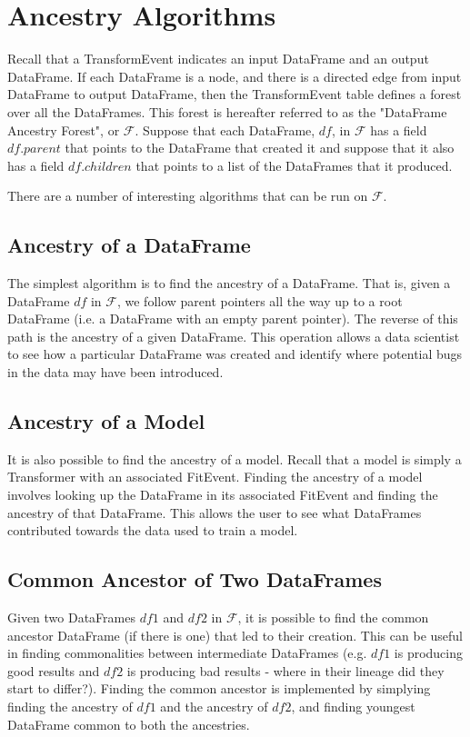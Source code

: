 \section{Ancestry Algorithms}
Recall that a TransformEvent indicates an input DataFrame and an output DataFrame. If each DataFrame is a node,
and there is a directed edge from input DataFrame to output DataFrame, then the TransformEvent table defines
a forest over all the DataFrames. This forest is hereafter referred to as the "DataFrame Ancestry Forest", or $\mathcal{F}$.
Suppose that each DataFrame, $df$, in $\mathcal{F}$ has a field $df.parent$ that points to the DataFrame that created it
and suppose that it also has a field $df.children$ that points to a list of the DataFrames that it produced.

There are a number of interesting algorithms that can be run on $\mathcal{F}$.

\subsection{Ancestry of a DataFrame}
The simplest algorithm is to find the ancestry of a DataFrame. That is, given a DataFrame $df$ in $\mathcal{F}$, we
follow parent pointers all the way up to a root DataFrame (i.e. a DataFrame with an empty parent pointer). The reverse
of this path is the ancestry of a given DataFrame. This operation allows a data scientist to see how a particular DataFrame
was created and identify where potential bugs in the data may have been introduced.

\subsection{Ancestry of a Model}
It is also possible to find the ancestry of a model. Recall that a model is simply a Transformer with an associated
FitEvent. Finding the ancestry of a model involves looking up the DataFrame in its associated FitEvent and finding the
ancestry of that DataFrame. This allows the user to see what DataFrames contributed towards the data used to train a model.

\subsection{Common Ancestor of Two DataFrames}
Given two DataFrames $df1$ and $df2$ in $\mathcal{F}$, it is possible to find the common ancestor DataFrame (if there is one)
that led to their creation. This can be useful in finding commonalities between intermediate DataFrames (e.g. $df1$ is producing
good results and $df2$ is producing bad results - where in their lineage did they start to differ?). Finding the common ancestor
is implemented by simplying finding the ancestry of $df1$ and the ancestry of $df2$, and finding youngest DataFrame common to both
the ancestries.

